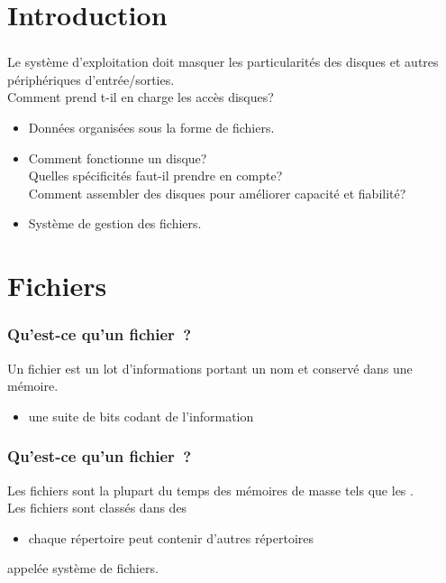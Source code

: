\section{Introduction}
\begin{frame}
\frametitle{\insertsection}
Le système d'exploitation doit masquer les particularités 
des disques et autres périphériques d'entrée/sorties. \\
\vspace{0.5cm}
Comment prend t-il en charge les accès disques?
\vspace{0.5cm}
\begin{itemize}
\item Données organisées sous la forme de \alert{fichiers}.
\item Comment fonctionne un disque? \\
  Quelles spécificités faut-il prendre en compte?\\
  Comment assembler des disques pour améliorer capacité et fiabilité?
\item Système de gestion des fichiers.
\end{itemize}
\end{frame}



\section{Fichiers}
\begin{frame}
  \frametitle{Qu'est-ce qu'un fichier~?}
  Un \alert{fichier} est un \alert{lot d'informations} portant un nom et conservé dans
  une mémoire. \\
  \begin{itemize}
  \item une suite de bits codant de l'information
    \texttt{}
  \end{itemize}
\end{frame}

\begin{frame}
  \frametitle{Qu'est-ce qu'un fichier~?}
  Les fichiers sont la plupart du temps  des mémoires de
  masse tels que les .\\
  \vspace{0.5cm}
  Les fichiers sont classés dans des 
  \begin{itemize}
  \item chaque répertoire peut contenir d'autres répertoires
  \end{itemize}
    appelée \alert{système de fichiers}.
\end{frame}

